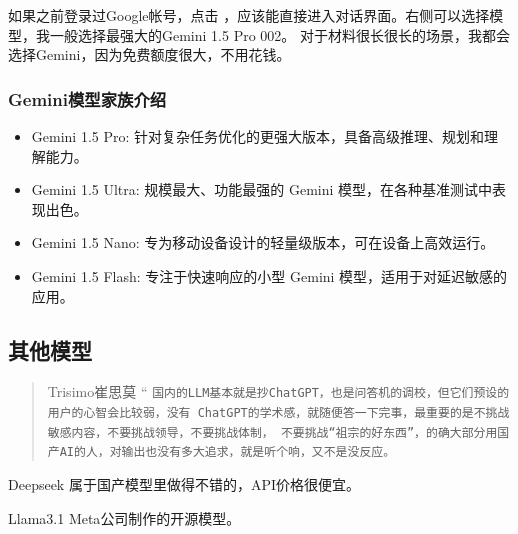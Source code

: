 如果之前登录过\textsf{Google}帐号，点击 \href{https://aistudio.google.com/app/prompts/new_chat}{\color{black}\faLink}，应该能直接进入对话界面。右侧可以选择模型，我一般选择最强大的\textsf{Gemini 1.5 Pro 002}。
对于材料很长很长的场景，我都会选择\textsf{Gemini}，因为免费额度很大，不用花钱。

\subsubsection*{\textsf{Gemini}模型家族介绍}
    \begin{itemize}
        \item \textsf{Gemini 1.5 Pro:}  针对复杂任务优化的更强大版本，具备高级推理、规划和理解能力。
        \item \textsf{Gemini 1.5 Ultra:}  规模最大、功能最强的 \textsf{Gemini} 模型，在各种基准测试中表现出色。
        \item \textsf{Gemini 1.5 Nano:}  专为移动设备设计的轻量级版本，可在设备上高效运行。
        \item \textsf{Gemini 1.5 Flash:} 专注于快速响应的小型 \textsf{Gemini} 模型，适用于对延迟敏感的应用。
    \end{itemize}

\subsection{其他模型}

\begin{quote}{Trisimo崔思莫}
    \Huge{“}
    \normalsize \texttt{国内的LLM基本就是抄ChatGPT，也是问答机的调校，但它们预设的用户的心智会比较弱，没有
    ChatGPT的学术感，就随便答一下完事，最重要的是不挑战敏感内容，不要挑战领导，不要挑战体制，
    不要挑战“祖宗的好东西”，的确大部分用国产AI的人，对输出也没有多大追求，就是听个响，又不是没反应。}
    \end{quote}



\textsf{Deepseek} \href{https://www.deepseek.com}{\color{black}\faLink} 属于国产模型里做得不错的，API价格很便宜。


\textsf{Llama3.1} \href{https://huggingface.co/chat/}{\color{black}\faLink} \textsf{Meta}公司制作的开源模型。

